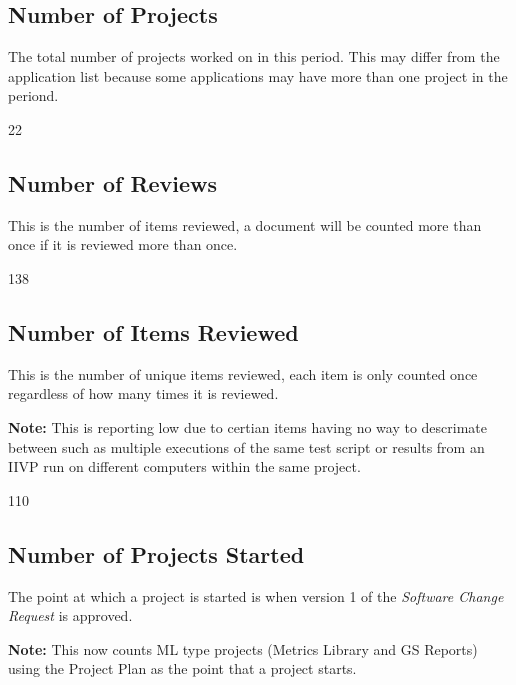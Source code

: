 \documentclass{article}
\begin{document}
\subsection{Number of Projects}
The total number of  projects worked on in this period. This may differ from the
application list because some applications may have more than one project in
the periond.

\begin{Schunk}
\begin{Soutput}
[1] 22
\end{Soutput}
\end{Schunk}

\subsection{Number of Reviews}
This is the number of items reviewed, a document will be counted more than once
if it is reviewed more than once.

\begin{Schunk}
\begin{Soutput}
[1] 138
\end{Soutput}
\end{Schunk}

\subsection{Number of Items Reviewed}
This is the number of unique items reviewed, each item is only counted once
regardless of how many times it is reviewed.

\textbf{Note:} This is reporting low due to certian items having no way to
descrimate between such as multiple executions of the same test script or
results from an IIVP run on different computers within the same project.

\begin{Schunk}
\begin{Soutput}
[1] 110
\end{Soutput}
\end{Schunk}

\subsection{Number of Projects Started}
The point at which a project is started is when version 1 of the \textit{Software
Change Request} is approved.

\textbf{Note:} This now counts ML type projects (Metrics Library and GS Reports)
using the Project Plan as the point that a project starts.
\end{document}
